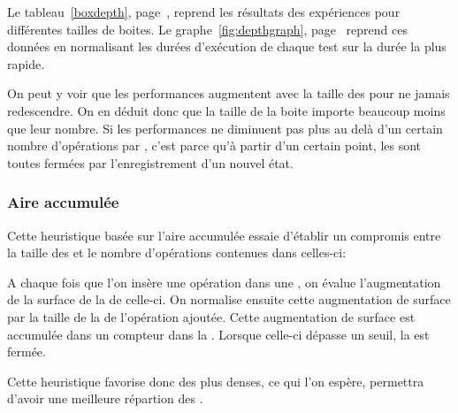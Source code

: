 				Le tableau~\ref{boxdepth}, page~\pageref{boxdepth}, reprend les résultats des expériences pour différentes tailles de boites.
				Le graphe~\ref{fig:depthgraph}, page~\pageref{depthgraph} reprend ces données en normalisant les durées d'exécution de chaque
				test sur la durée la plus rapide. 

				On peut y voir que les performances augmentent avec la taille des \BO pour ne jamais redescendre. On en déduit donc que 
				la taille de la boite importe beaucoup moins que leur nombre. Si les performances ne diminuent pas plus au delà d'un
				certain nombre d'opérations par \BO, c'est parce qu'à partir d'un certain point, les \BO sont toutes fermées par 
				l'enregistrement d'un nouvel état. 

			\subsubsection{Aire accumulée}
				Cette heuristique basée sur l'aire accumulée essaie d'établir un compromis entre la taille des \BO et le nombre d'opérations
				contenues dans celles-ci:

				A chaque fois que l'on insère une opération dans une \BO, on évalue l'augmentation de la surface de la \BB de celle-ci. 
				On normalise ensuite cette augmentation de surface par la taille de la \BB de l'opération ajoutée. Cette augmentation
				de surface est accumulée dans un compteur dans la \BO. Lorsque celle-ci dépasse un seuil, la \BO est fermée. 

				Cette heuristique favorise donc des \BO plus denses, ce qui l'on espère, permettra d'avoir une meilleure répartion des
				\BO.

